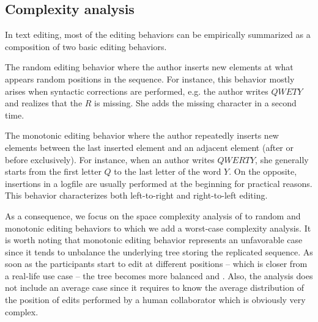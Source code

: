 

\subsection{Complexity analysis}
\label{subsec:complexity}

In text editing, most of the editing behaviors can be empirically summarized
as a composition of two basic editing behaviors.
\begin{inparaenum}[(i)]
\item The random editing behavior where the author inserts new elements at what
  appears random positions in the sequence. For instance, this behavior mostly
  arises when syntactic corrections are performed, e.g. the author writes
  $QWETY$ and realizes that the $R$ is missing. She adds the missing character
  in a second time.
\item The monotonic editing behavior where the author repeatedly inserts new
  elements between the last inserted element and an adjacent element (after or
  before exclusively). For instance, when an author writes $QWERTY$, she
  generally starts from the first letter $Q$ to the last letter of the word
  $Y$. On the opposite, insertions in a logfile are usually performed at the
  beginning for practical reasons. This behavior characterizes both
  left-to-right and right-to-left editing.
\end{inparaenum}

As a consequence, we focus on the space complexity analysis of \LSEQ to random
and monotonic editing behaviors to which we add a worst-case complexity
analysis. It is worth noting that monotonic editing behavior represents an
unfavorable case since it tends to unbalance the underlying tree storing the
replicated sequence. As soon as the participants start to edit at different
positions -- which is closer from a real-life use case -- the tree becomes more
balanced and . Also, the
analysis does not include an average case since it requires to know the average
distribution of the position of edits performed by a human collaborator which is
obviously very complex. 


